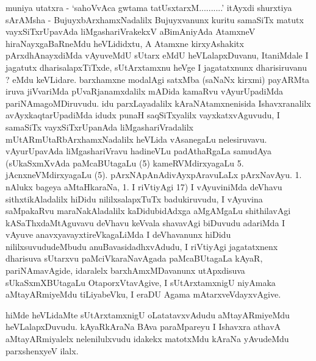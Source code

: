 \begin{artha}
muniya utatxra - `sahoVvAca gwtama tatUsxtarxM..........' itAyxdi shurxtiya sArAMsha - BujuyxbArxhamxNadalilx Bujuyxvanunx kuritu samaSiTx matutx vayxSiTxrUpavAda liMgashariVrakekxV aBimAniyAda AtamxneV hiraNayxgaBaRneMdu heVLididxtu, A Atamxne kirxyAshakitx pArxdhAnayxdiMda vAyuveMdU sUtarx eMdU heVLalapxDuvanu, Ita\-niMdale I jagatutx dharisalapxTiTxde, sUtArxtamxnu heVge I jagatatxnunx dharisiruvanu ? eMdu keVLidare. barxhamxne modalAgi satxMba (saNaNx kirxmi) payARMta iruva jiVvariMda pUvaRjanamxdalilx mADida kamaRvu vAyurUpadiMda pariNAmagoMDiruvudu. idu parxLayadalilx kAraNAtamxnenisida Ishavxranalilx avAyxkaqtarUpadiMda idudx punaH saqSiTxyalilx vayxkatxvAguvudu, I samaSiTx vayxSiTxrUpanAda liMgashariVradalilx mUtARmUtaRbArxhamxNadalilx heVLida vAsanegaLu nelesiruvavu. vAyurUpavAda liMga\-shariVravu hadineVLu padAthaRgaLa samudAya (sUkaSxmXvAda paMcaBUtagaLu (5) kameRVMdirxyagaLu 5. jAcnxneVMdirxyagaLu (5). pArxNApAnAdivAyxpAravuLaLx pArxNa\-vAyu. 1. nAlukx bageya aMtaHkaraNa, 1. I riVtiyAgi 17) I vAyuvi\-niMda deVhavu sithxtikAladalilx hiDidu nililxsalapxTuTx badukiruvudu, I vAyuvina saMpakaRvu maraNakAladalilx kaDidubidAdxga aMgAMgaLu shithilavAgi kASaThxdaMtA\-guvavu deVhavu keVvala shavavAgi biDuvudu adariMda I vAyuve anavxyavayxti\-reVkagaLiMda I deVhavanunx hiDidu nililxsuvududeMbudu anuBavasidadhxvAdudu, I riVtiyAgi jagatatxnenx dharisuva sUtarxvu paMciVkaraNavAgada paMcaBUtagaLa \-kAyaR, pariNAmavAgide, idaralelx barxhAmxMDavanunx utApxdisuva sUkaSxmXBUtagaLu OtaporxVtavAgive, I sUtArxtamxnigU niyAmaka aMtayARmiyeMdu tiLiya\-beVku, I eraDU Agama mAtarxveVdayxvAgive.
\end{artha}


\begin{artha}
hiMde heVLidaMte sUtArxtamxnigU oLatatavxvAdudu aMtayARmiyeMdu heVLalapxDuvudu. kAyaRkAraNa BAva paraMpareyu I Ishavxra athavA aMtayARmiyalelx nelenilulxvudu idakekx matotxMdu kAraNa yAvudeMdu parxshenxyeV ilalx.
\end{artha}

